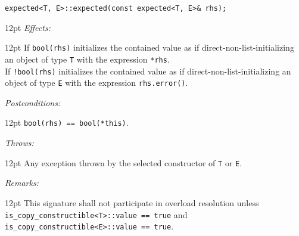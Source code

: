 \documentclass[a4paper,10pt]{article}
\newcommand{\cpp}[1]{\lstinline{#1}}
\newcommand{\wordingItem}[1]{\noindent\textit{#1:}}
\newenvironment{wordingTextItem}[1]{\wordingItem{#1}\vspace{7pt}\noindent\begin{adjustwidth}{12pt}{}}{\vspace{7pt}\end{adjustwidth}}
\newenvironment{wordingPara}{\begin{adjustwidth}{12pt}{}}{\end{adjustwidth}}
\begin{document}
\begin{lstlisting}[xleftmargin=0pt]
expected<T, E>::expected(const expected<T, E>& rhs);
\end{lstlisting}
\begin{wordingPara}
\begin{wordingTextItem}{Effects}
If \cpp{bool(rhs)} initializes the contained value as if direct-non-list-initializing an object of type \cpp{T} with the expression \cpp{*rhs}.\\

\noindent
If \cpp{!bool(rhs)} initializes the contained value as if direct-non-list-initializing an object of type \cpp{E} with the expression \cpp{rhs.error()}.
\end{wordingTextItem}
\begin{wordingTextItem}{Postconditions}
\cpp{bool(rhs) == bool(*this)}.
\end{wordingTextItem}
\begin{wordingTextItem}{Throws}
Any exception thrown by the selected constructor of \cpp{T} or \cpp{E}.
\end{wordingTextItem}
\begin{wordingTextItem}{Remarks}
This signature shall not participate in overload resolution unless\\
\cpp{is_copy_constructible<T>::value == true} and\\
\cpp{is_copy_constructible<E>::value == true}.
\end{wordingTextItem}
\end{wordingPara}
\end{document}
